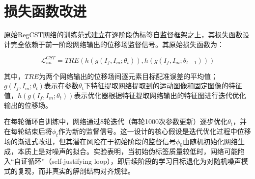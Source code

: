 \begin{algorithm}[h]
    \label{alg:block_training}
    \label{alg:c-cst-2}
\end{algorithm}


\section{损失函数改进}

原始RegCST网络的训练范式建立在逐阶段伪标签自监督框架之上，其损失函数设计完全依赖于前一阶段网络输出的位移场监督信号。其原始损失函数为：

\begin{equation}
    \mathcal{L}_{un}^{CST}=TRE(h(g(I_f,I_m;\theta_t)),h(g(I_f,I_m;\theta_{t-1})))
    \label{eq:3}
\end{equation}

其中，$TRE$为两个网络输出的位移场间逐元素目标配准误差的平均值；$g(I_f,I_m;\theta_t)$表示在参数$\theta_t$下特征提取网络提取到的运动图像和固定图像的特征值，$h(g(I_f,I_m;\theta_t))$表示优化器根据特征提取网络输出的特征图进行迭代优化输出的位移场。

在每轮循环自训练中，网络通过8轮迭代（每轮1000次参数更新）逐步优化$\theta_t$，并在每轮结束后将$\phi_t$作为新的监督信号。这一设计的核心假设是迭代优化过程中位移场的渐进式改进，但其潜在风险在于初始阶段的监督信号$\phi_0$由随机初始化网络生成，本质上是对噪声的拟合。实验表明，当初始伪标签质量较低时，网络可能陷入“自证循环”（self-justifying loop），即后续阶段的学习目标退化为对随机噪声模式的复现，而非真实的解剖结构对齐规律。

